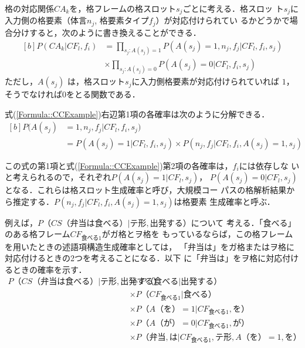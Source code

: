 \documentclass[japanese]{jnlp_1.3e}
\begin{document}
格の対応関係$\mathit{CA}_k$を，格フレームの格スロット$s_j$ごとに考える．格スロッ
ト$s_j$に入力側の格要素（体言$n_j$, 格要素タイプ$f_j$）が対応付けられてい
るかどうかで場合分けすると，次のように書き換えることができる．
\begin{equation}
\begin{aligned}[b]
 P(\mathit{CA}_k|\mathit{CF}_l,f_i) 
  & = \prod_{s_j: A(s_j)=1} P(A(s_j) =1,n_j,f_j|\mathit{CF}_l,f_i,s_j) \\
  & \times \prod_{s_j: A(s_j)=0} P(A(s_j)=0|\mathit{CF}_l,f_i,s_j) 
\end{aligned}
\label{Formula::CCExample}
\end{equation}
ただし，$A(s_j)$ は，格スロット$s_j$に入力側格要素が対応付けられていれば
$1$，そうでなければ$0$をとる関数である．

式(\ref{Formula::CCExample})右辺第1項の各確率は次のように分解できる．
\begin{equation}
\begin{aligned}[b]
 P(A(s_j) & =1,n_j,f_j|\mathit{CF}_l,f_i,s_j) \\
  & = P(A(s_j)=1|\mathit{CF}_l,f_i,s_j) \times P(n_j,f_j|\mathit{CF}_l,f_i,A(s_j)=1,s_j) 
\end{aligned}
\label{Formula::CaseAndExample}
\end{equation}

この式の第1項と式(\ref{Formula::CCExample})第2項の各確率は，$f_i$には依存しな
いと考えられるので，それぞれ$P(A(s_j)=1|\mathit{CF}_l,s_j)$，
$P(A(s_j)=0|\mathit{CF}_l,s_j)$となる．これらは格スロット生成確率と呼び，大規模コー
パスの格解析結果から推定する．$P(n_j,f_j|\mathit{CF}_l,f_i,A(s_j)=1,s_j)$は格要素
生成確率と呼ぶ．

例えば，$P（CS（\mbox{弁当は食べる}）|\mbox{テ形},\mbox{出発する}）$について
考える．「食べる」のある格フレーム$CF_{\mathrm{食べる1}}$がガ格とヲ格を
もっているならば，この格フレームを用いたときの述語項構造生成確率としては，
「弁当は」をガ格またはヲ格に対応付けるときの2つを考えることになる．以下
に「弁当は」をヲ格に対応付けるときの確率を示す．
\begin{align*}
 P（CS（\mbox{弁当は食べる}）|\mbox{テ形},\mbox{出発する}）
 & = P（\mathrm{食べる|出発する}）\\
 & \times P（CF_{\mathrm{食べる1}}|\mathrm{食べる}）\\
 & \times P（A（\mathrm{を}）=1|CF_{\mathrm{食べる1}},\mbox{を}）\\
 & \times P（A（\mathrm{が}）=0|CF_{\mathrm{食べる1}},\mbox{が}）\\
 & \times P（\mathrm{弁当}, \mathrm{は}|CF_{\mathrm{食べる1}},\mbox{テ形},A（\mathrm{を}） =1,\mbox{を}）
\end{align*}
\end{document}

